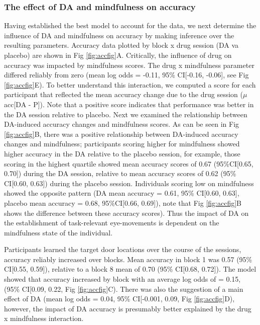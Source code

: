 \documentclass{article}
\begin{document}
\hypertarget{the-effect-of-da-and-mindfulness-on-accuracy}{%
\subsubsection{The effect of DA and mindfulness on
accuracy}\label{the-effect-of-da-and-mindfulness-on-accuracy}}

Having established the best model to account for the data, we next
determine the influence of DA and mindfulness on accuracy by making
inference over the resulting parameters. Accuracy data plotted by block
x drug session (DA va placebo) are shown in Fig \ref{fig:accfig}A.
Critically, the influence of drug on accuracy was impacted by
mindfulness scores. The drug x mindfulness parameter differed reliably
from zero (mean log odds = -0.11, 95\% CI{[}-0.16, -0.06{]}, see Fig
\ref{fig:accfig}E). To better understand this interaction, we computed a
score for each participant that reflected the mean accuracy change due
to the drug session (\(\mu\) acc{[}DA - P{]}). Note that a positive
score indicates that performance was better in the DA session relative
to placebo. Next we examined the relationship between DA-induced
accuracy changes and mindfulness scores. As can be seen in Fig
\ref{fig:accfig}B, there was a positive relationship between DA-induced
accuracy changes and mindfulness; participants scoring higher for
mindfulness showed higher accuracy in the DA relative to the placebo
session, for example, those scoring in the highest quartile showed mean
accuracy scores of 0.67 (95\%CI{[}0.65, 0.70{]}) during the DA session,
relative to mean accuracy scores of 0.62 (95\% CI{[}0.60, 0.63{]})
during the placebo session. Individuals scoring low on mindfulness
showed the opposite pattern (DA mean accuracy = 0.61, 95\% CI{[}0.60,
0.63{]}, placebo mean accuracy = 0.68, 95\%CI{[}0.66, 0.69{]}), note
that Fig \ref{fig:accfig}B shows the difference between these accuracy
scores). Thus the impact of DA on the establishment of task-relevant
eye-movements is dependent on the mindfulness state of the individual.

Participants learned the target door locations over the course of the
sessions, accuracy reliably increased over blocks. Mean accuracy in
block 1 was 0.57 (95\% CI{[}0.55, 0.59{]}), relative to a block 8 mean
of 0.70 (95\% CI{[}0.68, 0.72{]}). The model showed that accuracy
increased by block with an average log odds of = 0.15, (95\% CI{[}0.09,
0.22, Fig \ref{fig:accfig}C). There was also the suggestion of a main
effect of DA (mean log odds = 0.04, 95\% CI{[}-0.001, 0.09, Fig
\ref{fig:accfig}D), however, the impact of DA accuracy is presumably
better explained by the drug x mindfulness interaction.
\end{document}
